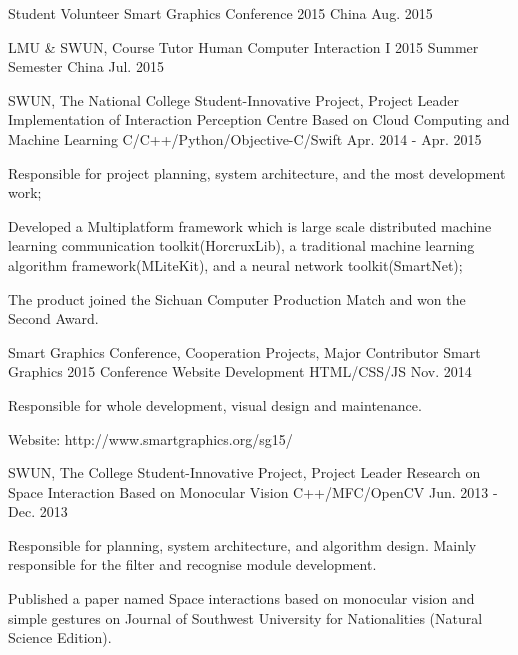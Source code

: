 \begin{cventries}
	\cventry
    {Student Volunteer}
    {Smart Graphics Conference 2015}
    {China}
    {Aug. 2015}
    {
    }
    
  	\cventry
    {LMU \& SWUN, Course Tutor}
    {Human Computer Interaction I 2015 Summer Semester}
    {China}
    {Jul. 2015}
    {
    }
    
  	\cventry
    {SWUN, The National College Student-Innovative Project, Project Leader}
    {Implementation of Interaction Perception Centre Based on Cloud Computing and Machine Learning}
    {C/C++/Python/Objective-C/Swift}
    {Apr. 2014 - Apr. 2015}
    {
      \begin{cvitems}
        \item {Responsible for project planning, system architecture, and the most development work;}
        \item {Developed a Multiplatform framework which is large scale distributed machine learning communication toolkit(HorcruxLib), a traditional machine learning algorithm framework(MLiteKit), and a neural network toolkit(SmartNet);}
        \item {The product joined the Sichuan Computer Production Match and won the Second Award.}
      \end{cvitems}
    }
    
    
  	\cventry
    {Smart Graphics Conference, Cooperation Projects, Major Contributor}
    {Smart Graphics 2015 Conference Website Development}
    {HTML/CSS/JS}
    {Nov. 2014}
    {
      \begin{cvitems}
        \item {Responsible for whole development, visual design and maintenance.}
        \item {Website: http://www.smartgraphics.org/sg15/}
      \end{cvitems}
    }
    
    
  	\cventry
    {SWUN, The College Student-Innovative Project, Project Leader}
    {Research on Space Interaction Based on Monocular Vision}
    {C++/MFC/OpenCV}
    {Jun. 2013 - Dec. 2013}
    {
      \begin{cvitems}
        \item {Responsible for planning, system architecture, and algorithm design. Mainly responsible for the filter and recognise module development.}
        \item {Published a paper named Space interactions based on monocular vision and simple gestures on Journal of Southwest University for Nationalities (Natural Science Edition).}
      \end{cvitems} 
    }
    

\end{cventries}
